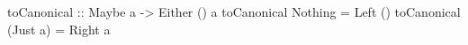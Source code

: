\begin{code}
toCanonical :: Maybe a -> Either () a
toCanonical Nothing  = Left ()
toCanonical (Just a) = Right a
\end{code}
